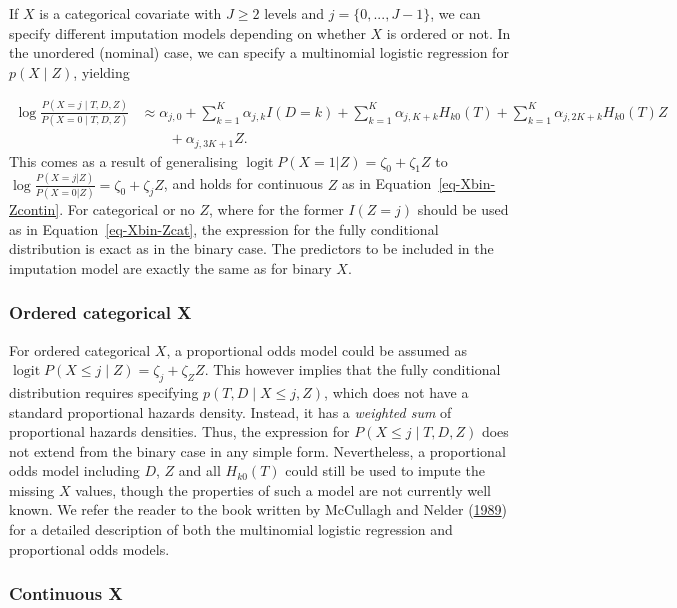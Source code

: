 \documentclass[
  letterpaper,
  DIV=11,
  numbers=noendperiod]{scrreprt}
\DeclareMathOperator{\logit}{logit}
\begin{document}
If \(X\) is a categorical covariate with \(J \geq 2\) levels and
\(j = \{0,..., J-1\}\), we can specify different imputation models
depending on whether \(X\) is ordered or not. In the unordered (nominal)
case, we can specify a multinomial logistic regression for
\(p(X \mid Z)\), yielding

\[
\begin{aligned}
    \log \frac{P(X = j \mid T,D,Z)}{P(X = 0\mid T,D,Z)} &\approx \alpha_{j,0}  + \sum^K_{k = 1} \alpha_{j,k} I(D=k) + \sum^K_{k = 1} \alpha_{j,K + k} H_{k0}(T) + \sum^K_{k = 1} \alpha_{j,2K + k} H_{k0}(T) Z \nonumber \\
    &\qquad + \alpha_{j,3K + 1} Z.
\end{aligned}
\] This comes as a result of generalising
\(\logit P(X=1|Z) = \zeta_0 + \zeta_1 Z\) to
\(\log \frac{P(X=j|Z)}{P(X=0|Z)} = \zeta_0 + \zeta_j Z\), and holds for
continuous \(Z\) as in Equation~\ref{eq-Xbin-Zcontin}. For categorical
or no \(Z\), where for the former \(I(Z = j)\) should be used as in
Equation~\ref{eq-Xbin-Zcat}, the expression for the fully conditional
distribution is exact as in the binary case. The predictors to be
included in the imputation model are exactly the same as for binary
\(X\).

\hypertarget{ordered-categorical-x}{%
\subsubsection{Ordered categorical X}\label{ordered-categorical-x}}

For ordered categorical \(X\), a proportional odds model could be
assumed as \(\logit P(X \leq j \mid Z) = \zeta_{j} + \zeta_Z Z\). This
however implies that the fully conditional distribution requires
specifying \(p(T,D \mid X \leq j, Z)\), which does not have a standard
proportional hazards density. Instead, it has a \emph{weighted sum} of
proportional hazards densities. Thus, the expression for
\(P(X \leq j \mid T, D, Z)\) does not extend from the binary case in any
simple form. Nevertheless, a proportional odds model including \(D\),
\(Z\) and all \(H_{k0}(T)\) could still be used to impute the missing
\(X\) values, though the properties of such a model are not currently
well known. We refer the reader to the book written by McCullagh and
Nelder (\protect\hyperlink{ref-mccullagh1989generalized}{1989}) for a
detailed description of both the multinomial logistic regression and
proportional odds models.

\hypertarget{continuous-x}{%
\subsubsection{Continuous X}\label{continuous-x}}
\end{document}
